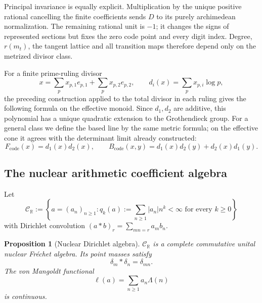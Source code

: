 \documentclass[11pt]{amsart}
\newtheorem{proposition}[theorem]{Proposition}
\theoremstyle{definition}
\theoremstyle{remark}
\newcommand{\R}{\mathbb R}
\begin{document}
Principal invariance is equally explicit.  Multiplication by the unique
positive rational cancelling the finite coefficients sends $D$ to its
purely archimedean normalization.
The remaining rational unit is $-1$; it changes the signs of represented
sections but fixes the zero code point and every digit index.  Degree,
$r(m_t)$, the tangent lattice and all transition maps therefore depend only
on the metrized divisor class.

For a finite prime-ruling divisor
\begin{equation}\label{eq:Dpr}
 x=\sum_p x_{p,1}e_{p,1}+\sum_p x_{p,2}e_{p,2},
 \qquad
 d_i(x)=\sum_p x_{p,i}\log p,
\end{equation}
the preceding construction applied to the total divisor in each ruling
gives the following formula on the effective monoid.  Since $d_1,d_2$ are
additive, this polynomial has a unique quadratic extension to the
Grothendieck group.  For a general class we define the based line by the
same metric formula; on the effective cone it agrees with the determinant
limit already constructed:
\begin{equation}\label{eq:cotangentRRform}
 F_{\mathrm{code}}(x)=d_1(x)d_2(x),\qquad
 B_{\mathrm{code}}(x,y)
 =d_1(x)d_2(y)+d_2(x)d_1(y).
\end{equation}

\subsection{The nuclear arithmetic coefficient algebra}

Let
\begin{equation}\label{eq:DirichletAlgebra}
 \mathcal C_{\R}:=
 \left\{a=(a_n)_{n\geq1}:q_k(a):=\sum_{n\geq1}|a_n|n^k<\infty
                  \text{ for every }k\geq0\right\}
\end{equation}
with Dirichlet convolution
$(a*b)_r=\sum_{mn=r}a_mb_n$.

\begin{proposition}[Nuclear Dirichlet algebra]\label{prop:nuclearDirichlet}
$\mathcal C_{\R}$ is a complete commutative unital nuclear Fr\'echet
algebra.  Its point masses satisfy
\begin{equation}\label{eq:DirichletComposition}
 \delta_m*\delta_n=\delta_{mn}.
\end{equation}
The von Mangoldt functional
\begin{equation}\label{eq:MangoldtFunctional}
 \ell(a)=\sum_{n\geq1}a_n\Lambda(n)
\end{equation}
is continuous.
\end{proposition}
\end{document}
